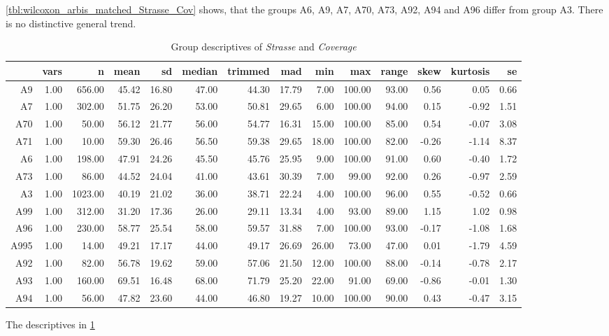 \cref{tbl:wilcoxon_arbis_matched_Strasse_Cov} shows, that the groups A6, A9, A7, A70, A73, A92, A94 and A96 differ from group A3. There is no distinctive general trend.
\begin{table}[ht!]
	\tiny
	\centering
	\begin{tabular}{rrrrrrrrrrrrrr}
		\hline
		& vars & n & mean & sd & median & trimmed & mad & min & max & range & skew & kurtosis & se \\ 
		\hline
		A9   & 1.00 & 656.00 & 45.42 & 16.80 & 47.00 & 44.30 & 17.79 & 7.00 & 100.00 & 93.00 & 0.56 & 0.05 & 0.66 \\ 
		A7   & 1.00 & 302.00 & 51.75 & 26.20 & 53.00 & 50.81 & 29.65 & 6.00 & 100.00 & 94.00 & 0.15 & -0.92 & 1.51 \\ 
		A70  & 1.00 & 50.00 & 56.12 & 21.77 & 56.00 & 54.77 & 16.31 & 15.00 & 100.00 & 85.00 & 0.54 & -0.07 & 3.08 \\ 
		A71  & 1.00 & 10.00 & 59.30 & 26.46 & 56.50 & 59.38 & 29.65 & 18.00 & 100.00 & 82.00 & -0.26 & -1.14 & 8.37 \\ 
		A6   & 1.00 & 198.00 & 47.91 & 24.26 & 45.50 & 45.76 & 25.95 & 9.00 & 100.00 & 91.00 & 0.60 & -0.40 & 1.72 \\ 
		A73  & 1.00 & 86.00 & 44.52 & 24.04 & 41.00 & 43.61 & 30.39 & 7.00 & 99.00 & 92.00 & 0.26 & -0.97 & 2.59 \\ 
		A3   & 1.00 & 1023.00 & 40.19 & 21.02 & 36.00 & 38.71 & 22.24 & 4.00 & 100.00 & 96.00 & 0.55 & -0.52 & 0.66 \\ 
		A99  & 1.00 & 312.00 & 31.20 & 17.36 & 26.00 & 29.11 & 13.34 & 4.00 & 93.00 & 89.00 & 1.15 & 1.02 & 0.98 \\ 
		A96  & 1.00 & 230.00 & 58.77 & 25.54 & 58.00 & 59.57 & 31.88 & 7.00 & 100.00 & 93.00 & -0.17 & -1.08 & 1.68 \\ 
		A995 & 1.00 & 14.00 & 49.21 & 17.17 & 44.00 & 49.17 & 26.69 & 26.00 & 73.00 & 47.00 & 0.01 & -1.79 & 4.59 \\ 
		A92  & 1.00 & 82.00 & 56.78 & 19.62 & 59.00 & 57.06 & 21.50 & 12.00 & 100.00 & 88.00 & -0.14 & -0.78 & 2.17 \\ 
		A93  & 1.00 & 160.00 & 69.51 & 16.48 & 68.00 & 71.79 & 25.20 & 22.00 & 91.00 & 69.00 & -0.86 & -0.01 & 1.30 \\ 
		A94  & 1.00 & 56.00 & 47.82 & 23.60 & 44.00 & 46.80 & 19.27 & 10.00 & 100.00 & 90.00 & 0.43 & -0.47 & 3.15 \\ 
		\bottomrule
	\end{tabular}
	\caption{Group descriptives of \textit{Strasse} and \textit{Coverage}}
	\label{tbl:descriptives_arbis_matched_Strasse_Cov}
\end{table}
The descriptives in \cref{tbl:descriptives_arbis_matched_Strasse_Cov}

